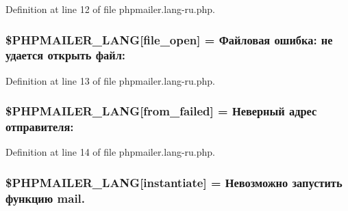 Definition at line 12 of file phpmailer.\+lang-\/ru.\+php.

\subsubsection[{\texorpdfstring{\$\+P\+H\+P\+M\+A\+I\+L\+E\+R\+\_\+\+L\+A\+NG}{$PHPMAILER_LANG}}]{\setlength{\rightskip}{0pt plus 5cm}\$P\+H\+P\+M\+A\+I\+L\+E\+R\+\_\+\+L\+A\+NG\mbox{[}\textquotesingle{}file\+\_\+open\textquotesingle{}\mbox{]} = \textquotesingle{}Файловая ошибка\+: не удается открыть файл\+: \textquotesingle{}}\hypertarget{phpmailer_8lang-ru_8php_a28d1a6517bf4c942a0ddd506188ad2e0}{}\label{phpmailer_8lang-ru_8php_a28d1a6517bf4c942a0ddd506188ad2e0}


Definition at line 13 of file phpmailer.\+lang-\/ru.\+php.

\subsubsection[{\texorpdfstring{\$\+P\+H\+P\+M\+A\+I\+L\+E\+R\+\_\+\+L\+A\+NG}{$PHPMAILER_LANG}}]{\setlength{\rightskip}{0pt plus 5cm}\$P\+H\+P\+M\+A\+I\+L\+E\+R\+\_\+\+L\+A\+NG\mbox{[}\textquotesingle{}from\+\_\+failed\textquotesingle{}\mbox{]} = \textquotesingle{}Неверный адрес отправителя\+: \textquotesingle{}}\hypertarget{phpmailer_8lang-ru_8php_adf832ae12155a09be077c6d5e4fd7e22}{}\label{phpmailer_8lang-ru_8php_adf832ae12155a09be077c6d5e4fd7e22}


Definition at line 14 of file phpmailer.\+lang-\/ru.\+php.

\subsubsection[{\texorpdfstring{\$\+P\+H\+P\+M\+A\+I\+L\+E\+R\+\_\+\+L\+A\+NG}{$PHPMAILER_LANG}}]{\setlength{\rightskip}{0pt plus 5cm}\$P\+H\+P\+M\+A\+I\+L\+E\+R\+\_\+\+L\+A\+NG\mbox{[}\textquotesingle{}instantiate\textquotesingle{}\mbox{]} = \textquotesingle{}Невозможно запустить функцию mail.\textquotesingle{}}\hypertarget{phpmailer_8lang-ru_8php_ad58dde16780f4770ccf4dd282ea1f5ad}{}\label{phpmailer_8lang-ru_8php_ad58dde16780f4770ccf4dd282ea1f5ad}


